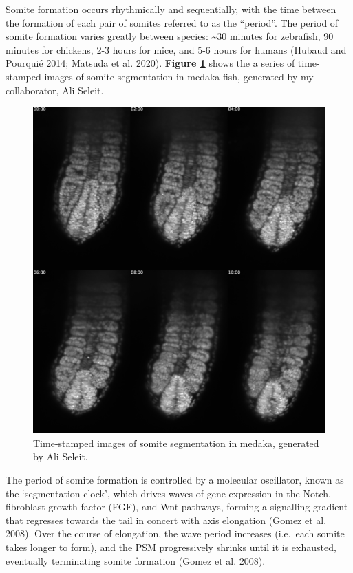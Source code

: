 \documentclass[
]{book}
\begin{document}
Somite formation occurs rhythmically and sequentially, with the time between the formation of each pair of somites referred to as the ``period''. The period of somite formation varies greatly between species: \textasciitilde30 minutes for zebrafish, 90 minutes for chickens, 2-3 hours for mice, and 5-6 hours for humans (Hubaud and Pourquié 2014; Matsuda et al. 2020). \textbf{Figure \ref{fig:somite-seg-ali}} shows the a series of time-stamped images of somite segmentation in medaka fish, generated by my collaborator, Ali Seleit.



\begin{figure}

\includegraphics[width=1\linewidth]{figs/somites/ali_fish_seg_compiled} \hfill{}

\caption{Time-stamped images of somite segmentation in medaka, generated by Ali Seleit.}\label{fig:somite-seg-ali}
\end{figure}

The period of somite formation is controlled by a molecular oscillator, known as the `segmentation clock', which drives waves of gene expression in the Notch, fibroblast growth factor (FGF), and Wnt pathways, forming a signalling gradient that regresses towards the tail in concert with axis elongation (Gomez et al. 2008). Over the course of elongation, the wave period increases (i.e.~each somite takes longer to form), and the PSM progressively shrinks until it is exhausted, eventually terminating somite formation (Gomez et al. 2008).
\end{document}
